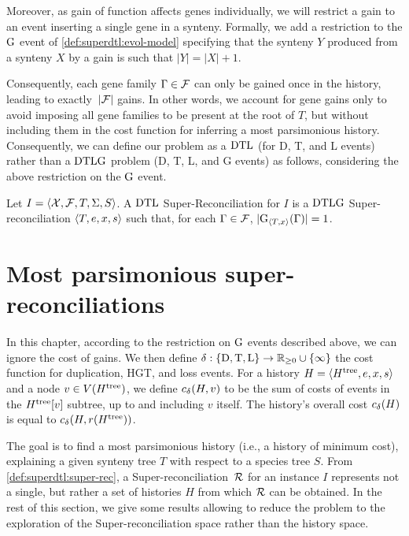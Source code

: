 Moreover, as gain of function affects genes individually, we will restrict a gain to an event inserting a single gene in a synteny.
Formally, we add a restriction to the \(\mathrm{G}\) event of \cref{def:superdtl:evol-model} specifying that the synteny \(Y\) produced from a synteny \(X\) by a gain is such that \(|Y| = |X| + 1\).

Consequently, each gene family \(\Gamma \in \mathcal{F}\) can only be gained once in the history, leading to exactly~\(|\mathcal{F}|\) gains.
In other words, we account for gene gains only to avoid imposing all gene families to be present at the root of \(T\), but without including them in the cost function for inferring a most parsimonious history.
Consequently, we can define our problem as a \(\mathrm{DTL}\) (for D, T, and L events) rather than a \(\mathrm{DTLG}\) problem (D, T, L, and G events) as follows, considering the above restriction on the \(\mathrm{G}\) event.

\begin{definition}
    Let \(I = \left\langle\mathcal{X}, \mathcal{F}, T, \Sigma, S\right\rangle\).
    A \(\mathrm{DTL}\) Super-Reconciliation for \(I\) is a \(\mathrm{DTLG}\) Super-reconciliation \(\left\langle T, e, x, s\right\rangle\) such that, for each \(\Gamma \in \mathcal{F}\), \(|\mathrm{G}_{\left\langle T, x\right\rangle}(\Gamma)| = 1\).
\end{definition}

\section{Most parsimonious super-reconciliations}\label{sec:superdtl:opt-problem}

In this chapter, according to the restriction on \(\mathrm{G}\) events described above, we can ignore the cost of gains.
We then define \(\delta\kern.1pt : \{\mathrm{D}, \mathrm{T}, \mathrm{L}\} \rightarrow \mathbb{R}_{\ge 0} \cup \{\infty\}\) the cost function for duplication, HGT, and loss events.
For a history \(H = \left\langle H^\mathrm{tree}, e, x, s\right\rangle\) and a node \(v \in V(H^\mathrm{tree})\), we define \(c_{\delta\kern.1pt}(H, v)\) to be the sum of costs of events in the \(H^\mathrm{tree}[v]\) subtree, up to and including \(v\) itself.
The history’s overall cost \(c_{\delta\kern.1pt}(H)\) is equal to \(c_{\delta\kern.1pt}(H, r(H^\mathrm{tree}))\).

The goal is to find a most parsimonious history (i.e., a history of minimum cost), explaining a given synteny tree \(T\) with respect to a species tree \(S\).
From \cref{def:superdtl:super-rec}, a Super-reconciliation~\(\mathcal{R}\) for an instance \(I\) represents not a
single, but rather a set of histories \(H\) from which
\(\mathcal{R}\) can be obtained. In the
rest of this section, we give some results allowing to reduce the
problem to the exploration of the Super-reconciliation space rather
than the history space.

